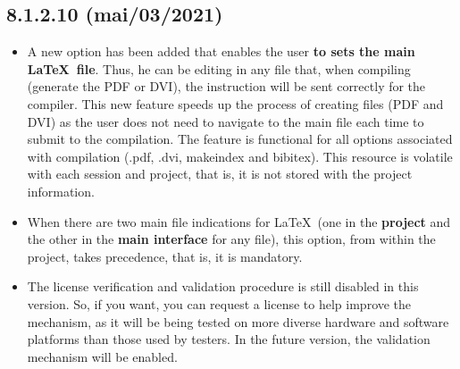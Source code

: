\subsection*{8.1.2.10 (mai/03/2021)}
\begin{itemize}
  \item A new option has been added that enables the user  
    \textbf{to sets the main \LaTeX ~file}. Thus, he can be editing in any
    file that, when compiling (generate the PDF or DVI), the instruction will be sent correctly
    for the compiler. This new feature speeds up the process of creating files (PDF and DVI) 
    as the user does not need to navigate to the main file each time to submit 
    to the compilation. The feature is functional for all options
    associated with compilation (.pdf, .dvi, makeindex and bibitex). This resource is volatile
    with each session and project, that is, it is not stored with the project information.
  \item When there are two main file indications for \LaTeX ~(one in the \textbf{project} and the
    other in the \textbf{main interface} for any file), this option, from within the project, 
    takes precedence, that is, it is mandatory.
  \item The license verification and validation procedure is still disabled in this version.
    So, if you want, you can request a license to help improve the mechanism,
    as it will be being tested on more diverse hardware and software platforms than
    those used by testers. In the future version, the validation mechanism will be enabled.
\end{itemize}

